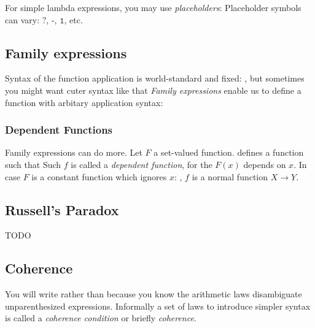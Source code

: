 For simple lambda expressions, you may use \textit{placeholders}:
Placeholder symbols can vary: $\texttt{?}$, $\texttt{-}$, $\texttt{1}$, etc.


\subsection{Family expressions}

Syntax of the function application is world-standard and fixed:
, but sometimes you might want cuter syntax like that
\textit{Family expressions} enable us to define a function with arbitary application syntax:

\subsubsection{Dependent Functions}

Family expressions can do more. Let $F$ a set-valued function.
defines a function
such that
Such $f$ is called a \textit{dependent function}, for the $F(x)$ depends on $x$. 
In case $F$ is a constant function which ignores $x$:
, $f$ is a normal function $X \to Y$. 

\subsection{Russell's Paradox}
TODO

\subsection{Coherence}

You will write
rather than
because you know the arithmetic laws
disambiguate unparenthesized expressions.
Informally a set of laws to introduce simpler syntax is called a \textit{coherence condition} or briefly \textit{coherence}.

